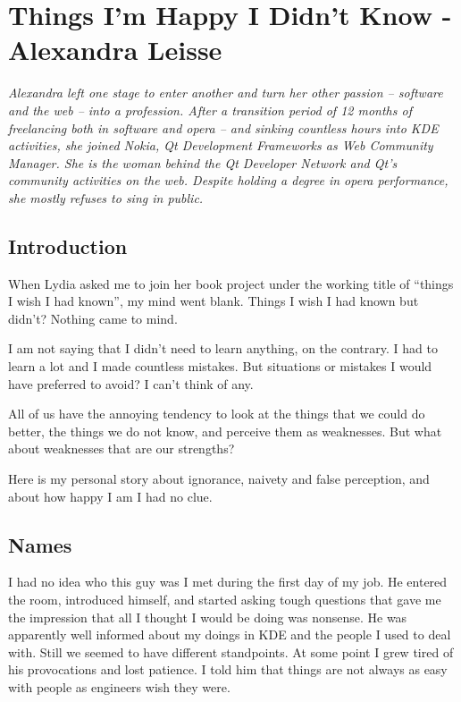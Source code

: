 \chapter{Things I'm Happy I Didn't Know - Alexandra Leisse}

\textit{Alexandra left one stage to enter another and turn her other passion --
software and the web -- into a profession. After a transition period of 12
months of freelancing both in software and opera -- and sinking countless hours
into KDE activities, she joined Nokia, Qt Development Frameworks as Web
Community Manager.
\newline
She is the woman behind the Qt Developer Network and Qt’s community activities
on the web. Despite holding a degree in opera performance, she mostly refuses to
sing in public.}

\section*{Introduction}

When Lydia asked me to join her book project under the working title of ``things
I wish I had known'', my mind went blank. Things I wish I had known but didn't?
Nothing came to mind.

I am not saying that I didn't need to learn anything, on the contrary. I had to
learn a lot and I made countless mistakes. But situations or mistakes I would
have preferred to avoid? I can't think of any.

All of us have the annoying tendency to look at the things that we could do
better, the things we do not know, and perceive them as weaknesses. But what
about weaknesses that are our strengths?

Here is my personal story about ignorance, naivety and false perception, and
about how happy I am I had no clue.

\section*{Names}

I had no idea who this guy was I met during the first day of my job. He entered
the room, introduced himself, and started asking tough questions that gave me
the impression that all I thought I would be doing was nonsense. He was
apparently well informed about my doings in KDE and the people I used to deal
with. Still we seemed to have different standpoints. At some point I grew tired
of his provocations and lost patience. I told him that things are not always as
easy with people as engineers wish they were.

